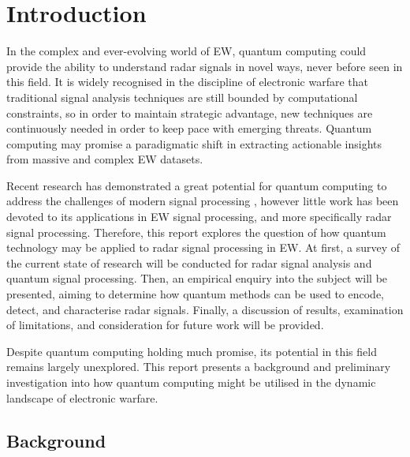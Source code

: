 \section{Introduction}
\label{sec:introduction}

In the complex and ever-evolving world of \ac{EW}, quantum computing could provide the ability to understand radar signals in novel ways, never before seen in this field. 
It is widely recognised in the discipline of electronic warfare that traditional signal analysis techniques are still bounded by computational constraints, so in order to maintain strategic advantage, new techniques are continuously needed in order to keep pace with emerging threats. 
Quantum computing may promise a paradigmatic shift in extracting actionable insights from massive and complex \ac{EW} datasets. 

Recent research has demonstrated a great potential for quantum computing to address the challenges of modern signal processing \cite{somma_quantum_2019, daskin_walk_2022},
however little work has been devoted to its applications in \ac{EW} signal processing, and more specifically radar signal processing.
Therefore, this report explores the question of how quantum technology may be applied to radar signal processing in \ac{EW}.
At first, a survey of the current state of research will be conducted for radar signal analysis and quantum signal processing. 
Then, an empirical enquiry into the subject will be presented, aiming to determine how quantum methods can be used to encode, detect, and characterise radar signals.
Finally, a discussion of results, examination of limitations, and consideration for future work will be provided. 

Despite quantum computing holding much promise, its potential in this field remains largely unexplored.
This report presents a background and preliminary investigation into how quantum computing might be utilised in the dynamic landscape of electronic warfare. 

\subsection{Background}~\label{subsec:background}

